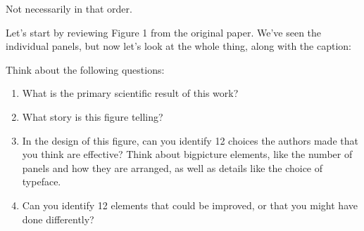 \documentclass[letterpaper,10pt,english]{sphinxmanual}
\begin{document}
Not necessarily in that order.

Let’s start by reviewing Figure 1 from the original paper.  We’ve seen the individual panels, but now let’s look at the whole thing, along with the caption:



 Think about the following questions:
\begin{enumerate}
%
\item {} 
What is the primary scientific result of this work?

\item {} 
What story is this figure telling?

\item {} 
In the design of this figure, can you identify 1\sphinxhyphen{}2 choices the authors made that you think are effective?  Think about big\sphinxhyphen{}picture elements, like the number of panels and how they are arranged, as well as details like the choice of typeface.

\item {} 
Can you identify 1\sphinxhyphen{}2 elements that could be improved, or that you might have done differently?

\end{enumerate}
\end{document}
